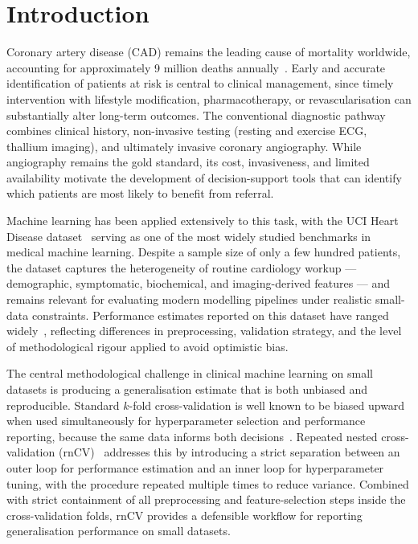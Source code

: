 \section{Introduction}
\label{sec:introduction}

Coronary artery disease (CAD) remains the leading cause of mortality worldwide, accounting for approximately 9 million deaths annually~\cite{who2023cvd}. Early and accurate identification of patients at risk is central to clinical management, since timely intervention with lifestyle modification, pharmacotherapy, or revascularisation can substantially alter long-term outcomes. The conventional diagnostic pathway combines clinical history, non-invasive testing (resting and exercise ECG, thallium imaging), and ultimately invasive coronary angiography. While angiography remains the gold standard, its cost, invasiveness, and limited availability motivate the development of decision-support tools that can identify which patients are most likely to benefit from referral.

Machine learning has been applied extensively to this task, with the UCI Heart Disease dataset~\cite{detrano1989cleveland} serving as one of the most widely studied benchmarks in medical machine learning. Despite a sample size of only a few hundred patients, the dataset captures the heterogeneity of routine cardiology workup --- demographic, symptomatic, biochemical, and imaging-derived features --- and remains relevant for evaluating modern modelling pipelines under realistic small-data constraints. Performance estimates reported on this dataset have ranged widely~\cite{detrano1989cleveland,gennari1989models}, reflecting differences in preprocessing, validation strategy, and the level of methodological rigour applied to avoid optimistic bias.

The central methodological challenge in clinical machine learning on small datasets is producing a generalisation estimate that is both unbiased and reproducible. Standard $k$-fold cross-validation is well known to be biased upward when used simultaneously for hyperparameter selection and performance reporting, because the same data informs both decisions~\cite{cawley2010overfitting}. Repeated nested cross-validation (rnCV)~\cite{varma2006bias,krstajic2014cross} addresses this by introducing a strict separation between an outer loop for performance estimation and an inner loop for hyperparameter tuning, with the procedure repeated multiple times to reduce variance. Combined with strict containment of all preprocessing and feature-selection steps inside the cross-validation folds, rnCV provides a defensible workflow for reporting generalisation performance on small datasets.

